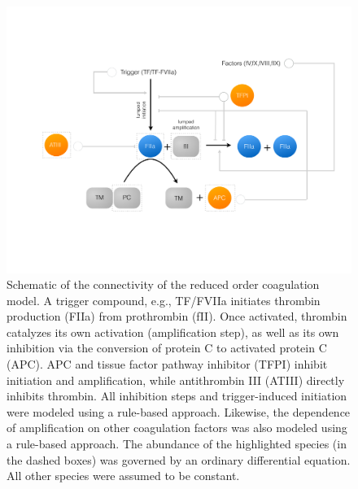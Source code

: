 \documentclass[processes,article,received,moreauthors,pdftex,12pt,a4paper]{mdpi}
\begin{document}
\begin{figure}[H]
\centering
\includegraphics[width=1.0\textwidth]{./figs/Figure-1-Network.pdf}
\caption{Schematic of the connectivity of the reduced order coagulation model. A trigger compound, e.g., TF/FVIIa initiates thrombin production (FIIa) from prothrombin (fII).
Once activated, thrombin catalyzes its own activation (amplification step), as well as its own inhibition via the conversion of protein C to activated protein C (APC).
APC and tissue factor pathway inhibitor (TFPI) inhibit initiation and amplification, while antithrombin III (ATIII) directly inhibits thrombin. 
All inhibition steps and trigger-induced initiation were modeled using a rule-based approach. 
Likewise, the dependence of amplification on other coagulation factors was also modeled using a rule-based approach. 
The abundance of the highlighted species (in the dashed boxes) was governed by an ordinary differential equation. 
All other species were assumed to be constant.}\label{fig-network}
\end{figure}
\end{document}

